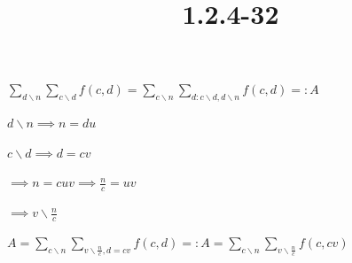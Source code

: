 \documentclass{article}
\title{1.2.4-32}
\begin{document}
\maketitle

\( \sum_{d \backslash n}\sum_{c \backslash d} f(c,d) = \sum_{c \backslash n}\sum_{d: c \backslash d, d\backslash n} f(c,d) =: A \)

\( d \backslash n \implies n = du \)

\( c \backslash d \implies d = cv \)

\( \implies n = cuv \implies \frac{n}{c} = uv \)

\( \implies v \backslash \frac{n}{c} \)

\( A = \sum_{c \backslash n}\sum_{v \backslash \frac{n}{c}, d = cv} f(c,d) =: A = \sum_{c \backslash n}\sum_{v \backslash \frac{n}{c}} f(c,cv) \)
\end{document}
